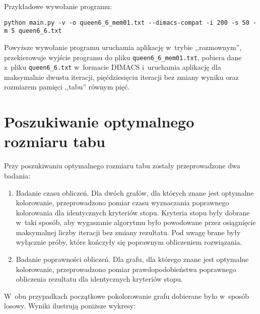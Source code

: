 \documentclass[a4paper,10pt]{article}
\begin{document}
\noindent Przykładowe wywołanie programu:

\begin{verbatim}
python main.py -v -o queen6_6_mem01.txt --dimacs-compat -i 200 -s 50 -m 5 queen6_6.txt
\end{verbatim}

\noindent Powyższe wywołanie programu uruchamia aplikację w~trybie ,,rozmownym'', przekierowuje wyjście programu do pliku \verb+queen6_6_mem01.txt+, pobiera dane z~pliku \verb+queen6_6.txt+ w~formacie DIMACS i~uruchamia aplikację dla maksymalnie dwustu iteracji, pięćdziesięciu iteracji bez zmiany wyniku oraz rozmiarem pamięci ,,tabu'' równym pięć.

\section*{Poszukiwanie optymalnego rozmiaru tabu}

Przy poszukiwaniu optymalnego rozmiaru tabu zostały przeprowadzone dwa badania:

\begin{enumerate}
    \item Badanie czasu obliczeń. Dla dwóch grafów, dla których znane jest optymalne kolorowanie, przeprowadzono pomiar czasu wyznaczania poprawnego kolorowania dla identycznych kryteriów stopu. Kryteria stopu były dobrane w~taki sposób, aby wygaszanie algorytmu było powodowane przez osiągnięcie maksymalnej liczby iteracji bez zmiany rezultatu. Pod uwagę brane były wyłącznie próby, które kończyły się poprawnym obliczeniem rozwiązania.
    \item Badanie poprawności obliczeń. Dla grafu, dla którego znane jest optymalne kolorowanie, przeprowadzono pomiar prawdopodobieństwa poprawnego obliczenia rezultatu dla identycznych kryteriów stopu.
\end{enumerate}

\noindent W~obu przypadkach początkowe pokolorowanie grafu dobierane było w~sposób losowy. Wyniki ilustrują poniższe wykresy:
\end{document}
